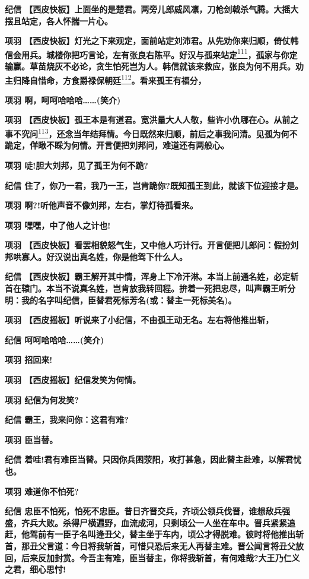 \textbf{纪信
【西皮快板】上面坐的是楚君。两旁儿郎威风凛，刀枪剑戟杀气腾。大摇大摆且站定，各人怀揣一片心。}

\textbf{项羽
【西皮快板】灯光之下来观定，面前站定刘沛君。从先劝你来归顺，倚仗韩信会用兵。城楼你把巧言论，左有张良右陈平。好汉与孤来站定}\protect\hyperlink{fn111}{\textsuperscript{111}}\textbf{，孤家与你定输赢。草苗烧灰不必论，贪生怕死岂为人。韩信就该来救应，张良为何不用兵。劝主归降自惜命，方食爵禄保朝廷}\protect\hyperlink{fn112}{\textsuperscript{112}}\textbf{。看来孤王有福分，}

\textbf{项羽 啊，呵呵哈哈哈\ldots{}\ldots{}(笑介)}

\textbf{项羽
【西皮快板】孤王本是有道君。宽洪量大人人敬，些许小仇哪在心。从前之事不究问}\protect\hyperlink{fn113}{\textsuperscript{113}}\textbf{，还念当年结拜情。今日既然来归顺，前后之事我问清。见孤为何不跪定，佯瞅不睬为何情。开言便把刘邦问，难道还有两般心。}

\textbf{项羽 唗!胆大刘邦，见了孤王为何不跪?}

\textbf{纪信
住了，你乃一君，我乃一王，岂肯跪你?既知孤王到此，就该下位迎接才是。}

\textbf{项羽 啊?!听他声音不像刘邦，左右，掌灯待孤看来。}

\textbf{项羽 嘿嘿，中了他人之计也!}

\textbf{项羽
【西皮快板】看罢相貌怒气生，又中他人巧计行。开言便把儿郎问：假扮刘邦哄寡人。好汉说出真名姓，你是他驾下什么人。}

\textbf{纪信
【西皮快板】霸王解开其中情，浑身上下冷汗淋。本当上前通名姓，必定斩首在辕门。本当不说真名姓，岂肯放我转回程。拚着一死把忠尽，叫声霸王听分明：我的名字叫纪信，臣替君死标芳名(或：替主一死标美名)。}

\textbf{项羽
【西皮摇板】听说来了小纪信，不由孤王动无名。左右将他推出斩，}

\textbf{纪信 呵呵哈哈哈\ldots{}\ldots{}(笑介)}

\textbf{项羽 招回来!}

\textbf{项羽 【西皮摇板】纪信发笑为何情。}

\textbf{项羽 纪信为何发笑?}

\textbf{纪信 霸王，我来问你：这君有难?}

\textbf{项羽 臣当替。}

\textbf{纪信
着哇!君有难臣当替。只因你兵困荥阳，攻打甚急，因此替主赴难，以解君忧也。}

\textbf{项羽 难道你不怕死?}

\textbf{纪信
忠臣不怕死，怕死不忠臣。昔日齐晋交兵，齐顷公领兵伐晋，谁想敌兵强盛，齐兵大败。杀得尸横遍野，血流成河，只剩顷公一人坐在车中。晋兵紧紧追赶，他驾前有一臣子名叫逄丑父，替主坐于车内，顷公才得脱难。彼时将他推出斩首，那丑父言道：今日将我斩首，可惜只恐后来无人再替主难。晋公闻言将丑父放回，后来反加封赏。今吾主有难，臣当替主，你将我斩首，有何难哉?大王乃仁义之君，细心思忖!}

